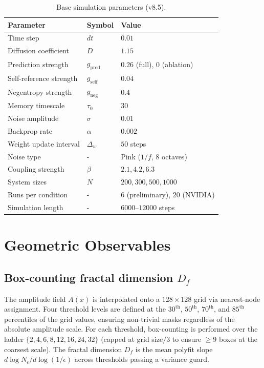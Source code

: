 \documentclass[12pt,a4paper]{article}
\theoremstyle{plain}
\theoremstyle{definition}
\begin{document}
\begin{table}[H]
\centering
\caption{Base simulation parameters (v8.5).}
\label{tab:params}
\begin{tabular}{lll}
\toprule
Parameter & Symbol & Value \\
\midrule
Time step              & $dt$              & $0.01$ \\
Diffusion coefficient  & $D$               & $1.15$ \\
Prediction strength    & $g_{\text{pred}}$ & $0.26$ (full), $0$ (ablation) \\
Self-reference strength& $g_{\text{self}}$ & $0.04$ \\
Negentropy strength    & $g_{\text{neg}}$  & $0.4$ \\
Memory timescale       & $\tau_0$          & $30$ \\
Noise amplitude        & $\sigma$          & $0.01$ \\
Backprop rate          & $\alpha$          & $0.002$ \\
Weight update interval & $\Delta_w$        & $50$ steps \\
Noise type             & -               & Pink ($1/f$, 8 octaves) \\
Coupling strength      & $\beta$           & $2.1, 4.2, 6.3$ \\
System sizes           & $N$               & $200, 300, 500, 1000$ \\
Runs per condition     & -               & $6$ (preliminary), $20$ (NVIDIA) \\
Simulation length      & -               & $6000$--$12000$ steps \\
\bottomrule
\end{tabular}
\end{table}

\section{Geometric Observables}
\label{sec:metrics}

\subsection{Box-counting fractal dimension \texorpdfstring{$D_f$}{Df}}

The amplitude field $A(x)$ is interpolated onto a $128 \times 128$ grid
via nearest-node assignment. Four threshold levels are defined at the
$30^{\text{th}}$, $50^{\text{th}}$, $70^{\text{th}}$, and $85^{\text{th}}$
percentiles of the grid values, ensuring non-trivial masks regardless of
the absolute amplitude scale. For each threshold, box-counting is performed
over the ladder $\{2, 4, 6, 8, 12, 16, 24, 32\}$ (capped at grid
size$/3$ to ensure $\geq 9$ boxes at the coarsest scale). The fractal
dimension $D_f$ is the mean polyfit slope $d\log N_\epsilon /
d\log(1/\epsilon)$ across thresholds passing a variance guard.
\end{document}
